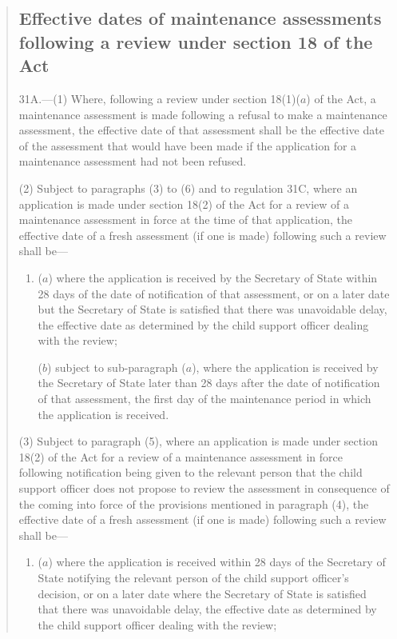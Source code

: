 \documentclass[12pt,a4paper]{article}
\begin{document}
\begin{quotation}
\subsection*{Effective dates of maintenance assessments following a review under section 18 of the Act}

31A.—(1) Where, following a review under section 18(1)($a$) of the Act, a maintenance assessment is made following a refusal to make a maintenance assessment, the effective date of that assessment shall be the effective date of the assessment that would have been made if the application for a maintenance assessment had not been refused.

(2) Subject to paragraphs (3) to (6) and to regulation 31C, where an application is made under section 18(2) of the Act for a review of a maintenance assessment in force at the time of that application, the effective date of a fresh assessment (if one is made) following such a review shall be—
\begin{enumerate}\item[]
($a$) where the application is received by the Secretary of State within 28 days of the date of notification of that assessment, or on a later date but the Secretary of State is satisfied that there was unavoidable delay, the effective date as determined by the child support officer dealing with the review;

($b$) subject to sub-paragraph ($a$), where the application is received by the Secretary of State later than 28 days after the date of notification of that assessment, the first day of the maintenance period in which the application is received.
\end{enumerate}

(3) Subject to paragraph (5), where an application is made under section 18(2) of the Act for a review of a maintenance assessment in force following notification being given to the relevant person that the child support officer does not propose to review the assessment in consequence of the coming into force of the provisions mentioned in paragraph (4), the effective date of a fresh assessment (if one is made) following such a review shall be—
\begin{enumerate}\item[]
($a$) where the application is received within 28 days of the Secretary of State notifying the relevant person of the child support officer’s decision, or on a later date where the Secretary of State is satisfied that there was unavoidable delay, the effective date as determined by the child support officer dealing with the review;


\end{enumerate}
\end{quotation}
\end{document}
